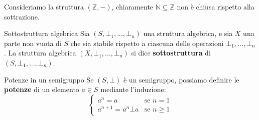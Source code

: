 \begin{example}
	Consideriamo la struttura $(\mathbb{Z}, -)$, chiaramente $\mathbb{N} \subseteq \mathbb{Z}$ non è chiusa rispetto alla sottrazione.
\end{example}

\begin{defbox}{Sottostruttura algebrica}
	Sia $(S,\bot_{1},...,\bot_{n})$ una struttura algebrica, e sia $X$ una parte non vuota di $S$ che sia stabile rispetto a ciascuna delle operazioni $\bot_{1},...,\bot_{n}$. La struttura algebrica $(X,\bot_{1},...,\bot_{n})$ si dice \textbf{sottostruttura} di $(S,\bot_{1},...,\bot_{n})$.
\end{defbox}

\begin{defbox}{Potenze in un semigruppo}
	Se $(S,\bot)$ è un semigruppo, possiamo definire le \textbf{potenze} di un elemento $a \in S$ mediante l'induzione:
	\begin{equation}
		\begin{cases*}
			a^{n} = a & \mbox{se } n=1 \\
			a^{n+1} = a^{n} \bot a & \mbox{se } n \geq 1
		\end{cases*}
	\end{equation} 
\end{defbox}

